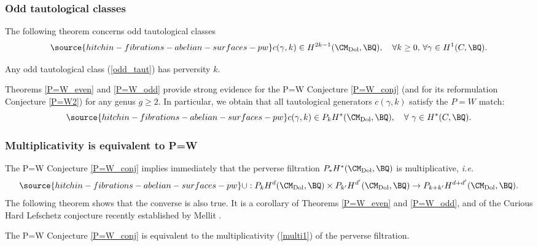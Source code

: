 \subsubsection{Odd tautological classes}
The following theorem concerns odd tautological classes
\begin{equation}\label{odd_taut}
\source{hitchin-fibrations-abelian-surfaces-pw}
c(\gamma, k) \in H^{2k-1}(\CM_{\mathrm{Dol}}, \BQ), \quad \forall k \geq 0, \, \forall \gamma \in H^1(C, \BQ).
\end{equation}

\begin{thm}
\notready\label{P=W_odd}
Any odd tautological class (\ref{odd_taut}) has perversity $k$.
\end{thm}

Theorems \ref{P=W_even} and \ref{P=W_odd} provide strong evidence for the P=W Conjecture
\ref{P=W_conj} (and for its reformulation Conjecture \ref{P=W2}) for any genus $g \geq 2$. In particular, we obtain that all tautological generators $c(\gamma,k)$ satisfy the $P=W$ match:
\begin{equation}\label{eqn9}
\source{hitchin-fibrations-abelian-surfaces-pw}
    c(\gamma, k) \in P_k H^*(\CM_{\mathrm{Dol}}, \BQ),\quad \forall~ \gamma \in H^*(C, \BQ).
\end{equation}

\subsubsection{Multiplicativity is equivalent to P=W} The P=W Conjecture \ref{P=W_conj}  implies immediately that the perverse filtration $P_*H^*(\CM_{\mathrm{Dol}}, \BQ)$ is multiplicative, \emph{i.e.}
\begin{equation}\label{multi1}
\source{hitchin-fibrations-abelian-surfaces-pw}
\cup: P_k H^d(\CM_\mathrm{Dol}, \BQ)\times P_{k'} H^{d'}(\CM_\mathrm{Dol}, \BQ) \to P_{k+k'} H^{d+d'}(\CM_\mathrm{Dol}, \BQ).
\end{equation}
The following theorem shows that the converse is also true. It is a corollary of Theorems \ref{P=W_even} and \ref{P=W_odd}, and of the Curious Hard Lefschetz conjecture recently established by Mellit \cite{Mellit}.

\begin{thm}
\notready\label{last}
The P=W Conjecture \ref{P=W_conj} is equivalent to the multiplicativity (\ref{multi1}) of the perverse filtration.
\end{thm}

